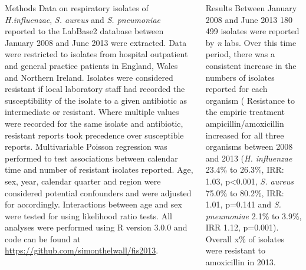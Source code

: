 \documentclass[final]{beamer}
\begin{document}
\begin{frame}
\begin{columns}[t]
  \begin{block}{Methods}
   Data on respiratory isolates of \textit{H.influenzae}, \textit{S. aureus} and \textit{S. pneumoniae} reported to the LabBase2 database between January 2008 and June 2013 were extracted. 
   Data were restricted to isolates from hospital outpatient and general practice patients in England, Wales and Northern Ireland.
   Isolates were considered resistant if local laboratory staff had recorded the susceptibility of the isolate to a given antibiotic as intermediate or resistant. 
   Where multiple values were recorded for the same isolate and antibiotic, resistant reports took precedence over susceptible reports. 
   Multivariable Poisson regression was performed to test associations between calendar time and number of resistant isolates reported.
   Age, sex, year, calendar quarter and region were considered potential confounders and were adjusted for accordingly.
   Interactions between age and sex were tested for using likelihood ratio tests. 
   All analyses were performed using R version 3.0.0 and code can be found at \url{https://github.com/simonthelwall/fis2013}.
  \end{block}
  
    \begin{block}{Results}
   Between January 2008 and June 2013 180 499 isolates were reported by \textit{n} labs. 
   Over this time period, there was a consistent increase in the numbers of isolates reported for each organism (%
   Resistance to the empiric treatment ampicillin/amoxicillin increased for all three organisms between 2008 and 2013 (\textit{H. influenzae} 23.4\% to 26.3\%, IRR: 1.03, p\textless0.001, \textit{S. aureus} 75.0\% to 80.2\%, IRR: 1.01, p=0.141 and \textit{S. pneumoniae} 2.1\% to 3.9\%, IRR 1.12, p=0.001).
   Overall x\% of isolates were resistant to amoxicillin in 2013. %
  \end{block}
  

\end{columns}
\end{frame}
\end{document}
